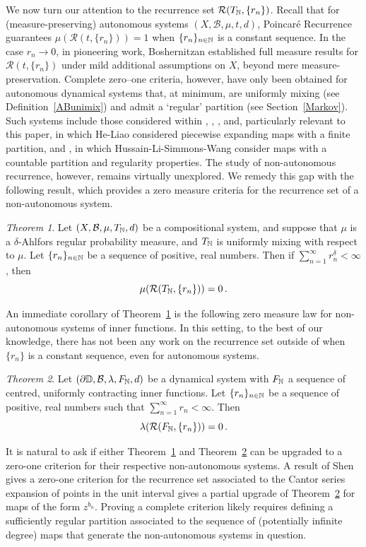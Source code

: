 \documentclass[11pt,reqno]{amsart}
\newcommand{\N}{{\Bbb N}}
\newcommand{\D}{{\Bbb D}}
\newcommand{\0}{\mathbf{0}}
\newtheorem{TAA}{Theorem}
\theoremstyle{remark}
\numberwithin{equation}{section}
\newtheorem{TAA}{Theorem}
\theoremstyle{remark}
\numberwithin{equation}{section}
\newcommand{\cR}{\mathcal{R}}
\begin{document}
We now turn our attention to the recurrence set $\cR(T_\N,\{r_n\})$. Recall that for (measure-preserving) autonomous systems $(X,\mathcal{B},\mu,t,d)$, Poincar\'e Recurrence guarantees $\mu(\cR(t,\{r_n\}))=1$ when $\{r_n\}_{n \in \N}$ is a constant sequence. In the case $r_n \to 0$, in pioneering work, Boshernitzan \cite{boshernitzan1993} established full measure results for $\cR(t,\{r_n\})$ under mild additional assumptions on $X$, beyond mere measure-preservation.
Complete zero–one criteria, however, have only been obtained for autonomous dynamical systems that, at minimum, are uniformly mixing (see Definition~\ref{ABunimix}) and admit a `regular' partition (see Section~\ref{Markov}). Such systems  include those considered within \cite{baker2021}, \cite{chang2019}, \cite{He}, \cite{kleinbock2023} and, particularly relevant to this paper, \cite{HeLi} in which He-Liao considered piecewise expanding maps with a finite partition, and \cite{HLSW}, in which Hussain-Li-Simmons-Wang consider maps with a countable partition and regularity properties.
 The study of non-autonomous recurrence, however, remains virtually unexplored.
 We remedy this gap with the following result, which provides a zero measure criteria for the recurrence set of a non-autonomous system.
\begin{TAA}\label{ABconv}
Let $(X,\mathcal{B},\mu,T_{\N}, d)$ be a compositional system, and suppose that $\mu$ is a $\delta$-Ahlfors regular probability measure, and $T_\N$ is uniformly mixing with respect to $\mu$.  Let $\{r_n\}_{n\in \N} $ be a sequence of positive, real numbers. Then 
 if  $\sum_{n=1}^\infty r_n^{\delta} <\infty $,  then 
$$
		\mu(\mathcal{R} (T_\N,\{r_n\} ))=
			0 \, .
$$
\end{TAA}
An immediate corollary of Theorem~\ref{ABconv} is the following  zero measure law for non-autonomous systems of inner functions. In this setting, to the best of our knowledge, there has not been any work on the recurrence set outside of when $\{r_n\}$ is a constant sequence, even for autonomous systems. 
\begin{TAA}\label{ABconvin}
Let $(\partial \D, \mathcal{B},\lambda, F_{\N},d)$ be a dynamical system with $F_\N$ a sequence of centred, uniformly contracting inner functions. Let $\{r_n\}_{n\in \N} $ be a sequence of positive, real numbers such that $\sum_{n=1}^\infty r_n <\infty $.
     Then 
$$ 
\lambda(\cR(F_\N,\{r_n\})) = 0 \, .$$
\end{TAA}
It is natural to ask if either Theorem~\ref{ABconv} and Theorem~\ref{ABconvin} can be upgraded to a zero-one criterion for their respective non-autonomous systems. A result of Shen \cite[Theorem~1.2] {nonautrec} gives a zero-one criterion for the recurrence set associated to the Cantor series expansion of points in the unit interval gives a partial upgrade of Theorem~\ref{ABconvin} for maps of the form $z^{b_n}$. Proving a complete criterion likely requires defining a sufficiently regular partition associated to the sequence of (potentially infinite degree) maps that generate the non-autonomous systems in question.
\end{document}
